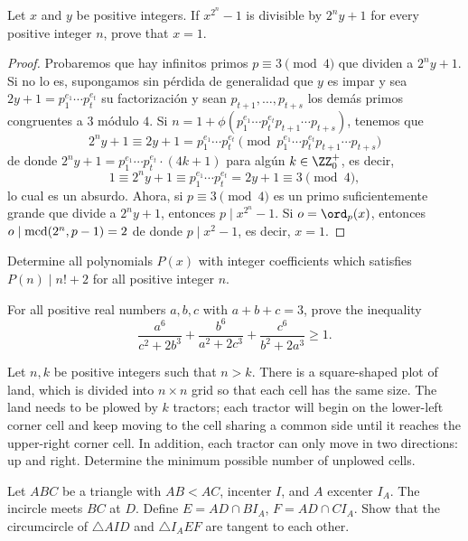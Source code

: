 
\begin{probHR}[ISL 2012/N6]
	Let $x$ and $y$ be positive integers. If $x^{2^n}-1$ is divisible by $2^ny+1$ for every positive integer $n$, prove that $x=1$.
\end{probHR}

\begin{proof}
	Probaremos que hay infinitos primos $p\equiv 3\pmod 4$ que dividen a $2^ny+1$. Si no lo es, supongamos sin pérdida de generalidad que $y$ es impar y sea $2y+1=p_1^{e_1}\cdots p_t^{e_t}$ su factorización y sean $p_{t+1},\dots,p_{t+s}$ los demás primos congruentes a $3$ módulo $4$. Si $n=1+\phi(p_1^{e_1}\cdots p_t^{e_t}p_{t+1}\cdots p_{t+s})$, tenemos que
	\[2^ny+1\equiv 2y+1=p_1^{e_1}\cdots p_t^{e_t}\pmod{p_1^{e_1}\cdots p_t^{e_t}p_{t+1}\cdots p_{t+s}}\]
	de donde $2^ny+1=p_1^{e_1}\cdots p_t^{e_t}\cdot(4k+1)$ para algún $k\in\ZZ^+_0$, es decir,
	\[1\equiv 2^ny+1\equiv p_1^{e_1}\cdots p_t^{e_t}=2y+1\equiv 3\pmod 4,\]
	lo cual es un absurdo. Ahora, si $p\equiv 3\pmod 4$ es un primo suficientemente grande que divide a $2^ny+1$, entonces $p\mid x^{2^n}-1$. Si $o=\ord_{p}(x)$, entonces $o\mid\operatorname{mcd}(2^n,p-1)=2$ de donde $p\mid x^2-1$, es decir, $x=1$.
\end{proof}


\begin{probEG}[Thailand MO 2020/10]
	Determine all polynomials $P(x)$ with integer coefficients which satisfies $P(n)\mid n!+2$ for all positive integer $n$.
\end{probEG}

\begin{probEG}[Thailand MO 2020/8]
	For all positive real numbers $a,b,c$ with $a+b+c=3$, prove the inequality
	\[\frac{a^6}{c^2+2b^3}+\frac{b^6}{a^2+2c^3}+\frac{c^6}{b^2+2a^3}\ge 1.\]
\end{probEG}

\begin{probEG}[Thailand MO 2020/9]
	Let $n,k$ be positive integers such that $n>k$. There is a square-shaped plot of land, which is divided into $n\times n$ grid so that each cell has the same size. The land needs to be plowed by $k$ tractors; each tractor will begin on the lower-left corner cell and keep moving to the cell sharing a common side until it reaches the upper-right corner cell. In addition, each tractor can only move in two directions: up and right. Determine the minimum possible number of unplowed cells.
\end{probEG}

\begin{probMG}[ISL 2020/G6]
	Let $ABC$ be a triangle with $AB<AC$, incenter $I$, and $A$ excenter $I_A$. The incircle meets $BC$ at $D$. Define $E=AD\cap BI_A$, $F=AD\cap CI_A$. Show that the circumcircle of $\triangle AID$ and $\triangle I_AEF$ are tangent to each other.
\end{probMG}
